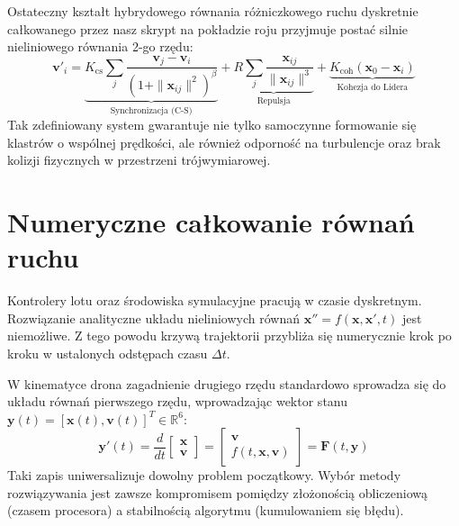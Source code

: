Ostateczny kształt hybrydowego równania różniczkowego ruchu dyskretnie całkowanego przez nasz skrypt na pokładzie roju przyjmuje postać silnie nieliniowego równania 2-go rzędu:
\begin{equation}
    \mathbf{v}'_i = \underbrace{ K_{\text{cs}} \sum_{j} \frac{\mathbf{v}_j - \mathbf{v}_i}{(1 + \|\mathbf{x}_{ij}\|^2)^\beta} }_{\text{Synchronizacja (C-S)}} 
    + \underbrace{ R \sum_{j} \frac{\mathbf{x}_{ij}}{\|\mathbf{x}_{ij}\|^3} }_{\text{Repulsja}} 
    + \underbrace{ K_{\text{coh}} (\mathbf{x}_0 - \mathbf{x}_i) }_{\text{Kohezja do Lidera}}
\end{equation}
Tak zdefiniowany system gwarantuje nie tylko samoczynne formowanie się klastrów o wspólnej prędkości, ale również odporność na turbulencje oraz brak kolizji fizycznych w przestrzeni trójwymiarowej.



\section{Numeryczne całkowanie równań ruchu}

Kontrolery lotu oraz środowiska symulacyjne pracują w czasie dyskretnym. Rozwiązanie analityczne układu nieliniowych równań $\mathbf{x}'' = f(\mathbf{x}, \mathbf{x}', t)$ jest niemożliwe. Z tego powodu krzywą trajektorii przybliża się numerycznie krok po kroku w ustalonych odstępach czasu $\Delta t$.

W kinematyce drona zagadnienie drugiego rzędu standardowo sprowadza się do układu równań pierwszego rzędu, wprowadzając wektor stanu $\mathbf{y}(t) = [\mathbf{x}(t), \mathbf{v}(t)]^T \in \mathbb{R}^6$:
\begin{equation}
    \mathbf{y}'(t) = \frac{d}{dt} \begin{bmatrix} \mathbf{x} \\ \mathbf{v} \end{bmatrix} = \begin{bmatrix} \mathbf{v} \\ f(t, \mathbf{x}, \mathbf{v}) \end{bmatrix} = \mathbf{F}(t, \mathbf{y})
\end{equation}
Taki zapis uniwersalizuje dowolny problem początkowy. Wybór metody rozwiązywania jest zawsze kompromisem pomiędzy złożonością obliczeniową (czasem procesora) a stabilnością algorytmu (kumulowaniem się błędu).


